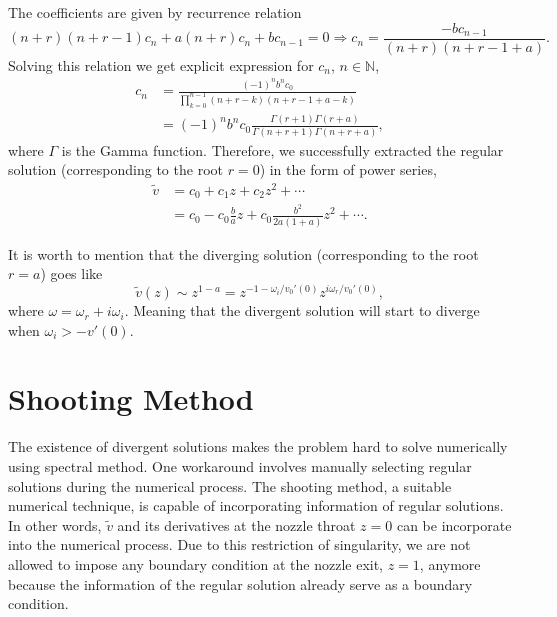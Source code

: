 The coefficients are given by recurrence relation
\begin{equation}
	(n+r)(n+r-1)c_n + a(n+r)c_n + bc_{n-1} = 0
	\Rightarrow
	c_n = \frac{-bc_{n-1}}{(n+r)(n+r-1+a)}.
\end{equation}
Solving this relation we get explicit expression for $c_n$, $n\in\mathbb{N}$,
\begin{equation}
	\begin{aligned}
		c_n & = \frac{(-1)^n b^n c_0}{\prod_{k=0}^{n-1} (n+r-k)(n+r-1+a-k)}               \\
		    & = (-1)^n b^n c_0 \frac{\Gamma(r+1)\Gamma(r+a)}{\Gamma(n+r+1)\Gamma(n+r+a)},
	\end{aligned}
	\label{eq:coefficient}
\end{equation}
where $\Gamma$ is the Gamma function. Therefore, we successfully extracted the regular solution (corresponding to the root $r=0$) in the form of power series,
\begin{equation} \label{eq:regular-solution}
	\begin{aligned}
		\tilde{v} & = c_0 + c_1z + c_2z^2 + \cdots                                \\
		          & = c_0 - c_0\frac{b}{a}z + c_0\frac{b^2}{2a(1+a)}z^2 + \cdots.
	\end{aligned}
\end{equation}

It is worth to mention that the diverging solution (corresponding to the root $r=a$) goes like
\begin{equation}
	\tilde{v}(z) \sim z^{1-a} = z^{-1-\omega_i/v_0'(0)}z^{i\omega_r/v_0'(0)},
\end{equation}
where $\omega = \omega_r + i\omega_i$. Meaning that the divergent solution will start to diverge when $\omega_i > -v'(0)$.

\section{Shooting Method}
The existence of divergent solutions makes the problem hard to solve numerically using spectral method. One workaround involves manually selecting regular solutions during the numerical process. The shooting method, a suitable numerical technique, is capable of incorporating information of regular solutions. In other words, $\tilde{v}$ and its derivatives at the nozzle throat $z=0$ can be incorporate into the numerical process. Due to this restriction of singularity, we are not allowed to impose any boundary condition at the nozzle exit, $z=1$, anymore because the information of the regular solution already serve as a boundary condition.

